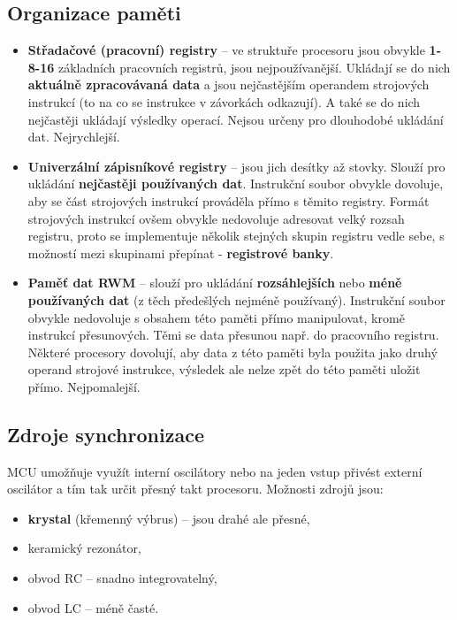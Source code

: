 \subsection{Organizace paměti}
\begin{itemize}
	\item \textbf{Střadačové (pracovní) registry }-- ve struktuře procesoru jsou obvykle \textbf{1-8-16} základních pracovních registrů, jsou nejpoužívanější. Ukládají se do nich \textbf{aktuálně zpracovávaná data} a jsou nejčastějším operandem strojových instrukcí (to na co se instrukce v závorkách odkazují). A také se do nich nejčastěji ukládají výsledky operací. Nejsou určeny pro dlouhodobé ukládání dat. Nejrychlejší.
	\item \textbf{Univerzální zápisníkové registry} -- jsou jich desítky až stovky. Slouží pro ukládání \textbf{nejčastěji používaných dat}. Instrukční soubor obvykle dovoluje, aby se část strojových instrukcí prováděla přímo s těmito registry. Formát strojových instrukcí ovšem obvykle nedovoluje adresovat velký rozsah registru, proto se implementuje několik stejných skupin registru vedle sebe, s možností mezi skupinami přepínat - \textbf{registrové banky}.
	\item \textbf{Paměť dat RWM} -- slouží pro ukládání \textbf{rozsáhlejších} nebo \textbf{méně používaných dat} (z těch předešlých nejméně používaný). Instrukční soubor obvykle nedovoluje s obsahem této paměti přímo manipulovat, kromě instrukcí přesunových. Těmi se data přesunou např. do pracovního registru. Některé procesory dovolují, aby data z této paměti byla použita jako druhý operand strojové instrukce, výsledek ale nelze zpět do této paměti uložit přímo. Nejpomalejší.
\end{itemize}

\subsection{Zdroje synchronizace}
MCU umožňuje využít interní oscilátory nebo na jeden vstup přivést externí oscilátor a tím tak určit přesný takt procesoru. Možnosti zdrojů jsou:
\begin{itemize}
	\item \textbf{krystal} (křemenný výbrus) – jsou drahé ale přesné,
	\item keramický rezonátor,
	\item obvod RC -- snadno integrovatelný,
	\item obvod LC -- méně časté.
\end{itemize}

